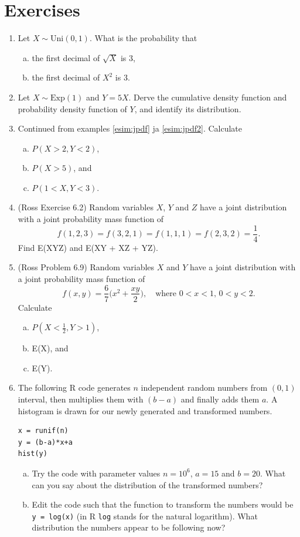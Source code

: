\documentclass[12pt,a4paper,leqno]{report}
\theoremstyle{plain}
\theoremstyle{definition}
\begin{document}
\section{Exercises}
\begin{enumerate}
\item Let $X \sim \text{Uni}(0,1)$. What is the probability that
\begin{enumerate}[(a)]
\item the first decimal of $\sqrt{X}$ is 3,
\item the first decimal of $X^2$ is 3.
\end{enumerate}
\item Let $X \sim \text{Exp}(1)$ and $Y = 5X$. Derve the cumulative density function and probability density function of $Y$, and identify its distribution.
\item Continued from examples \ref{esim:jpdf} ja \ref{esim:jpdf2}. Calculate 
\begin{enumerate}[(a)]
\item $P(X > 2, Y < 2)$,
\item $P(X > 5)$, and
\item $P(1 < X,Y < 3)$.
\end{enumerate}
\item (Ross Exercise 6.2) Random variables $X$, $Y$ and $Z$ have a joint distribution with a joint probability mass function of
\[
f(1,2,3) = f(3, 2, 1) = f(1, 1, 1) = f(2, 3, 2) = \frac{1}{4}.
\]
Find E(XYZ) and E(XY + XZ + YZ).
\item (Ross Problem 6.9) Random variables $X$ and $Y$ have a joint distribution with a joint probability mass function of
\[
f(x,y) = \frac{6}{7}\big(x^2 + \frac{xy}{2}\big), \quad \text{where } 0<x<1, \, 0<y<2.
\]
Calculate 
\begin{enumerate}[(a)]
\item $P(X < \frac{1}{2}, Y > 1)$,
\item E(X), and
\item E(Y).
\end{enumerate}
\item The following R code generates $n$ independent random numbers from $(0,1)$ interval, then multiplies them with $(b-a)$ and finally adds them $a$. A histogram is drawn for our newly generated and transformed numbers.
\begin{verbatim}
x = runif(n)
y = (b-a)*x+a
hist(y)
\end{verbatim}
\begin{enumerate}[(a)]
\item Try the code with parameter values $n = 10^6$, $a = 15$ and $b = 20$. What can you say about the distribution of the transformed numbers?
\item Edit the code such that the function to transform the numbers would be \verb|y = log(x)| (in R \verb|log| stands for the natural logarithm). What distribution the numbers appear to be following now?
\end{enumerate}
\end{enumerate}
\end{document}
